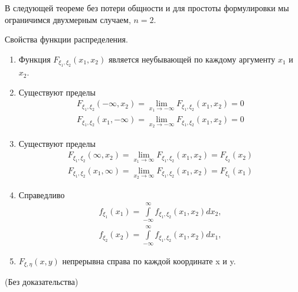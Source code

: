 В следующей теореме без потери общности и для простоты формулировки мы ограничимся двухмерным случаем, $n = 2$.

\begin{theorem}
\label{th:15.7}
Свойства функции распределения.
\begin{enumerate}
	\item Функция $F_{\xi_1,\xi_2}(x_1,x_2)$ является неубывающей по каждому аргументу $x_1$ и $x_2$.

	\item Существуют пределы 
	\begin{gather*}
	F_{\xi_1,\xi_2}(-\infty,x_2)=\lim\limits_{x_1\to-\infty}
	F_{\xi_1,\xi_2}(x_1,x_2)=0 \\
	F_{\xi_1,\xi_2}(x_1,-\infty)=\lim\limits_{x_2\to-\infty}
	F_{\xi_1,\xi_2}(x_1,x_2)=0
	\end{gather*}

	\item Существуют пределы 
	\begin{gather*}
	F_{\xi_1,\xi_2}(\infty,x_2)=\lim\limits_{x_1\to\infty}
	F_{\xi_1,\xi_2}(x_1,x_2)=F_{\xi_2}(x_2) \\
	F_{\xi_1,\xi_2}(x_1,\infty)=\lim\limits_{x_2\to\infty}
	F_{\xi_1,\xi_2}(x_1,x_2)=F_{\xi_1}(x_1)
	\end{gather*}

	\item Справедливо
	\begin{gather*}
	f_{\xi_1}(x_1)=\int\limits_{-\infty}^{\infty}f_{\xi_1,\xi_2}(x_1,x_2)dx_2, \\
	f_{\xi_2}(x_2)=\int\limits_{-\infty}^{\infty}f_{\xi_1,\xi_2}(x_1,x_2)dx_1,
	\end{gather*}

	\item $F_{\xi,\eta}(x, y)$ непрерывна справа по каждой координате x и y.



\end{enumerate}
(Без доказательства)
\end{theorem}

